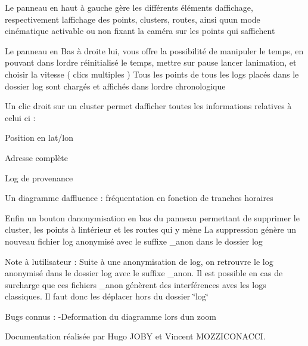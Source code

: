 Le panneau en haut à gauche gère les différents éléments d\textquotesingle{}affichage, respectivement l\textquotesingle{}affichage des points, clusters, routes, ainsi qu\textquotesingle{}un mode cinématique activable ou non fixant la caméra sur les points qui s\textquotesingle{}affichent

Le panneau en Bas à droite lui, vous offre la possibilité de manipuler le temps, en pouvant dans l\textquotesingle{}ordre réinitialisé le temps, mettre sur pause lancer l\textquotesingle{}animation, et choisir la vitesse ( clics multiples ) Tous les points de tous les logs placés dans le dossier log sont chargés et affichés dans l\textquotesingle{}ordre chronologique

Un clic droit sur un cluster permet d\textquotesingle{}afficher toutes les informations relatives à celui ci \+:
\begin{DoxyItemize}
\item Position en lat/lon
\item Adresse complète
\item Log de provenance
\item Un diagramme d\textquotesingle{}affluence \+: fréquentation en fonction de tranches horaires
\end{DoxyItemize}

Enfin un bouton d\textquotesingle{}anonymisation en bas du panneau permettant de supprimer le cluster, les points à l\textquotesingle{}intérieur et les routes qui y mène La suppression génère un nouveau fichier log anonymisé avec le suffixe \+\_\+anon dans le dossier log

Note à l\textquotesingle{}utilisateur \+: Suite à une anonymisation de log, on retrouvre le log anonymisé dans le dossier log avec le suffixe \+\_\+anon. Il est possible en cas de surcharge que ces fichiers \+\_\+anon génèrent des interférences aves les logs classiques. Il faut donc les déplacer hors du dossier \char`\"{}log\char`\"{}

Bugs connus \+: -\/\+Deformation du diagramme lors d\textquotesingle{}un zoom

Documentation réalisée par Hugo J\+O\+BY et Vincent M\+O\+Z\+Z\+I\+C\+O\+N\+A\+C\+CI. 